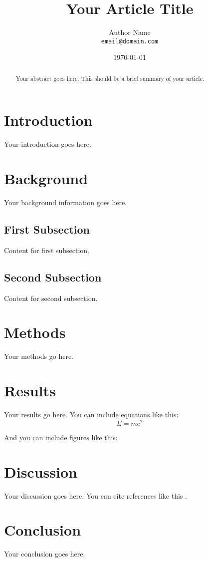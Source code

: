 \documentclass[12pt,a4paper]{article}
\title{Your Article Title}
\author{Author Name\\
        \texttt{email@domain.com}}
\date{\today}
\begin{document}
\maketitle

\begin{abstract}
Your abstract goes here. This should be a brief summary of your article.
\end{abstract}

\section{Introduction}
Your introduction goes here.

\section{Background}
Your background information goes here.

\subsection{First Subsection}
Content for first subsection.

\subsection{Second Subsection}
Content for second subsection.

\section{Methods}
Your methods go here.

\section{Results}
Your results go here. You can include equations like this:
\[
E = mc^2
\]

And you can include figures like this:

\section{Discussion}
Your discussion goes here. You can cite references like this \cite{example1}.

\section{Conclusion}
Your conclusion goes here.



\end{document}
